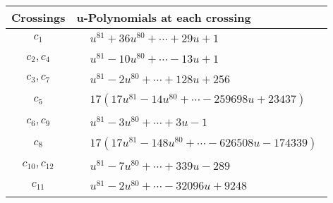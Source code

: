 \documentclass[1p]{elsarticle_modified}
\theoremstyle{definition}
\begin{document}
\begin{tabular}{m{50pt}|m{274pt}}
Crossings & \hspace{64pt}u-Polynomials at each crossing \\
\hline $$\begin{aligned}c_{1}\end{aligned}$$&$\begin{aligned}
&u^{81}+36 u^{80}+\cdots+29 u+1
\end{aligned}$\\
\hline $$\begin{aligned}c_{2},c_{4}\end{aligned}$$&$\begin{aligned}
&u^{81}-10 u^{80}+\cdots-13 u+1
\end{aligned}$\\
\hline $$\begin{aligned}c_{3},c_{7}\end{aligned}$$&$\begin{aligned}
&u^{81}-2 u^{80}+\cdots+128 u+256
\end{aligned}$\\
\hline $$\begin{aligned}c_{5}\end{aligned}$$&$\begin{aligned}
&17(17 u^{81}-14 u^{80}+\cdots-259698 u+23437)
\end{aligned}$\\
\hline $$\begin{aligned}c_{6},c_{9}\end{aligned}$$&$\begin{aligned}
&u^{81}-3 u^{80}+\cdots+3 u-1
\end{aligned}$\\
\hline $$\begin{aligned}c_{8}\end{aligned}$$&$\begin{aligned}
&17(17 u^{81}-148 u^{80}+\cdots-626508 u-174339)
\end{aligned}$\\
\hline $$\begin{aligned}c_{10},c_{12}\end{aligned}$$&$\begin{aligned}
&u^{81}-7 u^{80}+\cdots+339 u-289
\end{aligned}$\\
\hline $$\begin{aligned}c_{11}\end{aligned}$$&$\begin{aligned}
&u^{81}-2 u^{80}+\cdots-32096 u+9248
\end{aligned}$\\
\hline
\end{tabular}\\~\\
\end{document}
